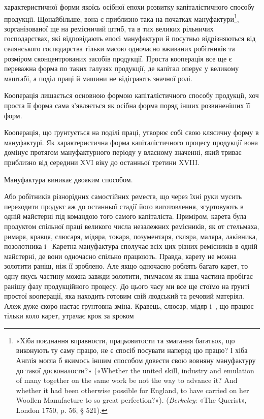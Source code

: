 \parcont{}  %
характеристичної форми якоїсь осібної епохи розвитку капіталістичного
способу продукції. Щонайбільше, вона є приблизно
така на початках мануфактури\footnote{
«Хіба поєднання вправности, працьовитости та змагання багатьох,
що виконують ту саму працю, не є спосіб посувати наперед цю працю?
І хіба Англія могла б якимось іншим способом довести свою вовняну мануфактуру
до такої досконалости?» («Whether the united skill, industry
and emulation of many together on the same work be not the way to advance
it? And whether it had been otherwise possible for England, to have
carried on her Woollen Manufacture to so great perfection?»). (\emph{Berkeley}: «The
Querist», London 1750, p. 56, § 521).
}, зорганізованої ще на ремісничий
штиб, та в тих великих рільничих господарствах, які відповідають
епосі мануфактури й посутньо відрізняються від селянського
господарства тільки масою одночасно вживаних робітників
та розміром сконцентрованих засобів продукції. Проста кооперація
все ще є переважна форма по таких галузях продукції, де
капітал оперує у великому маштабі, а поділ праці й машини не
відіграють значної ролі.

Кооперація лишається основною формою капіталістичного способу
продукції, хоч проста її форма сама з’являється як осібна
форма поряд інших розвиненіших її форм.


Кооперація, що ґрунтується на поділі праці, утворює собі
свою клясичну форму в мануфактурі. Як характеристична форма
капіталістичного процесу продукції вона домінує протягом мануфактурного
періоду у власному значенні, який триває приблизно
від середини XVI віку до останньої третини XVIII.

Мануфактура виникає двояким способом.

Або робітників різнорідних самостійних реместв, що через
їхні руки мусить переходити продукт аж до останньої стадії його
виготовлення, згуртовують в одній майстерні під командою того
самого капіталіста. Приміром, карета була продуктом спільної
праці великого числа незалежних ремісників, як от стельмаха,
римаря, кравця, слюсаря, мідяра, токаря, позументаря, скляра,
маляра, лаківника, позолотника і~ Каретна мануфактура
сполучає всіх цих різних ремісників в одній майстерні, де вони
одночасно спільно працюють. Правда, карету не можна золотити
раніш, ніж її зроблено. Але якщо одночасно роблять багато карет,
то одну якусь частину можна завжди золотити, тимчасом як
інша частина пробігає ранішу фазу продукційного процесу. До
цього часу ми все ще стоїмо на ґрунті простої кооперації, яка
находить готовим свій людський та речовий матеріял. Алеж
дуже скоро настає ґрунтовна зміна. Кравець, слюсар, мідяр і~, що працює тільки коло карет, утрачає крок за кроком
\parbreak{}  %
